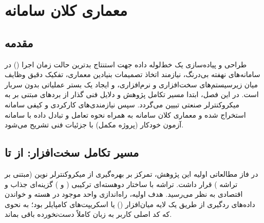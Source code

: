 
\chapter{معماری کلان سامانه}
\label{ch:architecture}

\section{مقدمه}
طراحی و پیاده‌سازی یک خط‌لوله داده جهت استنتاج بدترین حالت زمان اجرا () در سامانه‌های نهفته بی‌درنگ، نیازمند اتخاذ تصمیمات بنیادین معماری، تفکیک دقیق وظایف میان زیرسیستم‌های سخت‌افزاری و نرم‌افزاری، و ایجاد یک بستر عملیاتی بدون سربار است. در این فصل، ابتدا مسیر تکامل پژوهش و دلایل فنی گذار از بردهای مبتنی بر  به میکروکنترلر صنعتی  تبیین می‌گردد. سپس نیازمندی‌های کارکردی و کیفی سامانه استخراج شده و معماری کلان سامانه به همراه نحوه تعامل و تبادل داده با سامانه آزمون خودکار (پروژه مکمل) با جزئیات فنی تشریح می‌شود.

\section{مسیر تکامل سخت‌افزار: از  تا }
\label{sec:arch_evolution}
در فاز مطالعاتی اولیه این پژوهش، تمرکز بر بهره‌گیری از میکروکنترلر نوین  (مبتنی بر تراشه ) قرار داشت. تراشه  با ساختار دوهسته‌ای ترکیبی ( و ) گزینه‌ای جذاب و اقتصادی به نظر می‌رسید. هدف اولیه، راه‌اندازی واحد  موجود در هسته  و خواندن داده‌های ردگیری از طریق یک لایه میان‌افزار () یا اسکریپت‌های کامپایلر بود؛ به نحوی که کد اصلی کاربر به زبان  کاملاً دست‌نخورده باقی بماند.

